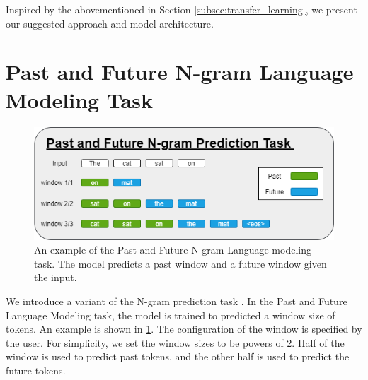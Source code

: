



Inspired by the abovementioned in Section \ref{subsec:transfer_learning}, we present our suggested approach and model architecture. 


\section{Past and Future N-gram Language Modeling Task} \label{sec:past_future_n-gram_lm}

\begin{figure}[hpbt!]

    \centering
    \includegraphics[width=\textwidth]{images/chap04_images/ngram language modeling.png}
    \caption{An example of the Past and Future N-gram Language modeling task. The model predicts a past window and a future window given the input.}
    \label{fig:n-gram_lm}
\end{figure}

We introduce a variant of the N-gram prediction task \cite{qi_prophetnet_2020}. In the Past and Future Language Modeling task, the model is trained to predicted a window size of tokens. An example is shown in \ref{fig:n-gram_lm}. The configuration of the window is specified by the user. For simplicity, we set the window sizes to be powers of 2. Half of the window is used to predict past tokens, and the other half is used to predict the future tokens. 

